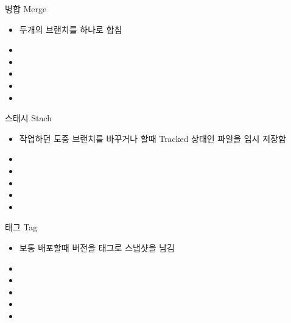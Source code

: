 \documentclass[aspectratio=1610,20pt,xcolor=pdftex,dvipsnames,table,handout]{beamer}
\begin{document}
		\begin{frame} [t,plain]
			\begin{block} {병합		\hrulefill Merge}
			\setlength{\leftmargini}{2em}			
			\begin{itemize}
				\item 두개의 브랜치를 하나로 합침 
				\item 
				\item 
				\item 
				\item 
				\item 
			\end{itemize}
			\end{block}						
		\end{frame}			

		\begin{frame} [t,plain]
			\begin{block} {스태시	\hrulefill Stach}
			\setlength{\leftmargini}{2em}			
			\begin{itemize}
				\item 작업하던 도중 브랜치를 바꾸거나 할때 Tracked 상태인 파일을 임시 저장함 
				\item 
				\item 
				\item 
				\item 
				\item 
			\end{itemize}
			\end{block}						
		\end{frame}			

		\begin{frame} [t,plain]
			\begin{block} {태그 	\hrulefill Tag}
			\setlength{\leftmargini}{2em}			
			\begin{itemize} 
				\item 보통 배포할때 버전을 태그로 스냅샷을 남김 
				\item 
				\item 
				\item 
				\item 
				\item 
			\end{itemize}
			\end{block}						
		\end{frame}			
\end{document}
